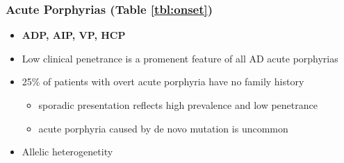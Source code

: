 \documentclass{scrartcl}
\begin{document}
\subsubsection{Acute Porphyrias (Table \ref{tbl:onset})}
\label{sec:org0c78976}
\begin{itemize}
\item \textbf{ADP, AIP, VP, HCP}
\item Low clinical penetrance is a promenent feature of all AD acute porphyrias
\item 25\% of patients with overt acute porphyria have no family history
\begin{itemize}
\item sporadic presentation reflects high prevalence and low penetrance
\item acute porphyria caused by de novo mutation is uncommon
\end{itemize}
\item Allelic heterogenetity
\end{itemize}
\end{document}
